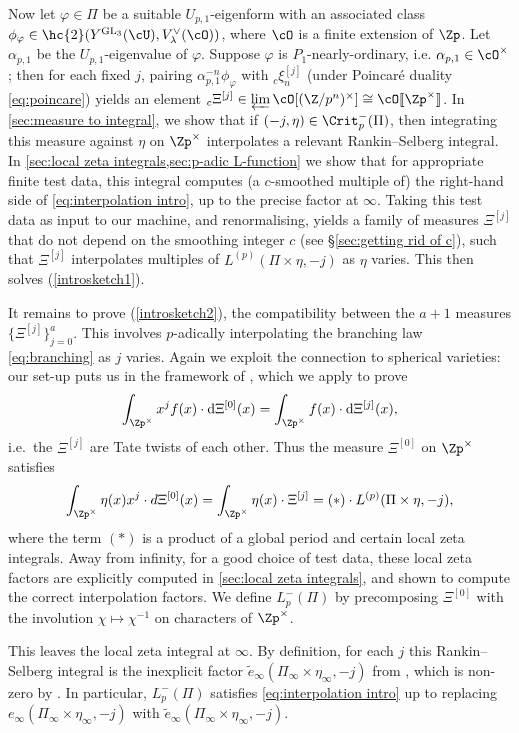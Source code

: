 \documentclass[10pt,reqno,a4paper]{amsart}
\newcommand{\GL}{\mathrm{GL}}
\begin{document}
Now let $\varphi \in \Pi$ be a suitable $U_{p,1}$-eigenform with an associated class $\phi_\varphi \in \hc{2}(Y^{\GL_3}(\cU),V_\lambda^\vee(\cO))$, where $\cO$ is a finite extension of $\Zp$. Let $\alpha_{p,1}$ be the $U_{p,1}$-eigenvalue of $\varphi$.  Suppose $\varphi$ is $P_1$-nearly-ordinary, i.e. $\alpha_{p,1} \in \cO^\times$; then for each fixed $j$, pairing $\alpha_{p,1}^{-n}\phi_\varphi$ with ${}_c\xi_n^{[j]}$ (under Poincar\'{e} duality \eqref{eq:poincare}) yields an element ${}_c\Xi^{[j]} \in \varprojlim \cO[(\Z/p^n)^\times] \cong \cO[\![\Zp^\times]\!]$. In \cref{sec:measure to integral}, we show that if $(-j,\eta) \in \Crit^-_p(\Pi)$, then integrating this measure against $\eta$ on $\Zp^\times$ interpolates a relevant Rankin--Selberg integral. In \cref{sec:local zeta integrals,sec:p-adic L-function} we show that for appropriate finite test data, this integral computes (a $c$-smoothed multiple of) the right-hand side of \eqref{eq:interpolation intro}, up to the precise factor at $\infty$. Taking this test data as input to our machine, and renormalising, yields a family of measures $\Xi^{[j]}$ that do not depend on the smoothing integer $c$ (see \S\ref{sec:getting rid of c}), such that $\Xi^{[j]}$ interpolates multiples of $L^{(p)}(\Pi\times\eta,-j)$ as $\eta$ varies. This then solves (\ref{introsketch1}).

It remains to prove (\ref{introsketch2}), the compatibility between the $a+1$ measures $\{\Xi^{[j]}\}_{j=0}^a$. This involves $p$-adically interpolating the branching law \eqref{eq:branching} as $j$ varies. Again we exploit the connection to spherical varieties: our set-up puts us in the framework of \cite{spherical_II}, which we apply to prove
\[
\int_{\Zp^\times} x^{j}f(x) \cdot\mathrm{d}\Xi^{[0]}(x)= \int_{\Zp^\times} f(x) \cdot \mathrm{d}\Xi^{[j]}(x),
\]
i.e.\ the $ \Xi^{[j]}$ are Tate twists of each other.  Thus the measure $\Xi^{[0]}$ on $\Zp^\times$ satisfies
\[
\int_{\Zp^\times} \eta(x)x^j \cdot  d\Xi^{[0]}(x) = 	\int_{\Zp^\times} \eta(x) \cdot  \Xi^{[j]}=  (*) \cdot L^{(p)}(\Pi\times\eta, -j),
\]
where the term $(*)$ is a product of a global period and certain local zeta integrals. Away from infinity, for a good choice of test data, these local zeta factors are explicitly computed in \cref{sec:local zeta integrals}, and shown to compute the correct interpolation factors. We define $L_p^-(\Pi)$ by precomposing $\Xi^{[0]}$ with the involution $\chi \mapsto \chi^{-1}$ on characters of $\Zp^\times$.

This leaves the local zeta integral at $\infty$. By definition, for each $j$ this Rankin--Selberg integral is the inexplicit factor $\widetilde{e}_\infty(\Pi_\infty \times \eta_\infty, -j)$ from \cite{Mah00}, which is non-zero by \cite{KS13,Sun17}. In particular, $L_p^-(\Pi)$ satisfies \eqref{eq:interpolation intro} up to replacing $e_\infty(\Pi_\infty \times \eta_\infty,-j)$ with $\widetilde{e}_\infty(\Pi_\infty \times \eta_\infty, -j)$.
\end{document}
